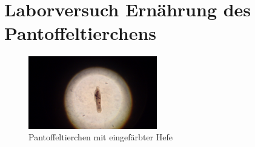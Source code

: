 \section{Laborversuch Ernährung des Pantoffeltierchens}
\begin{figure}[h!]
    \centering
    \includegraphics[width=0.5\textwidth]{fig/paramecium/DSC_1818.jpg}
    \caption{Pantoffeltierchen mit eingefärbter Hefe}
    \label{fig:paramecium}
\end{figure}

